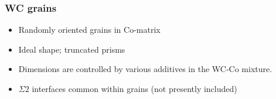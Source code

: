 \documentclass[11pt]{beamer} %
\begin{document}
\begin{frame}
 \frametitle{WC grains}
  \begin{itemize}
  \item Randomly oriented grains in Co-matrix
  \item Ideal shape; truncated prisms
  \begin{center}
  \end{center}
  \item Dimensions are controlled by various additives in the WC-Co mixture.
  \item $\Sigma2$ interfaces common within grains (not presently included)
  \end{itemize}
\end{frame}
\end{document}
